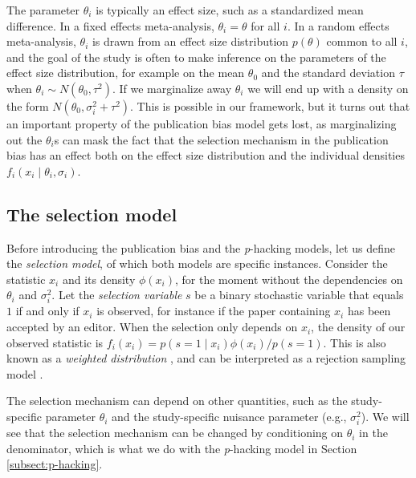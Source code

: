 \documentclass[useAMS,usenatbib,referee]{biom}
\begin{document}
The parameter $\theta_{i}$ is typically an effect size, such as a standardized mean difference. In a fixed effects meta-analysis, $\theta_{i}=\theta$ for all $i$. In a random effects meta-analysis, $\theta_{i}$ is drawn from an effect size distribution $p(\theta)$ common to all $i$, and the goal of the study is often to make inference on the parameters of the effect size distribution, for example on the mean $\theta_{0}$ and the standard deviation $\tau$ when $\theta_i \sim N(\theta_{0},\tau^2)$. If we marginalize away $\theta_{i}$ we will end up with a density on the form $N( \theta_{0},\sigma_{i}^{2}+\tau^{2})$. This is possible in our framework, but it turns out that an important property of the publication bias model gets lost, as marginalizing out the $\theta_{i}$s can mask the fact that the selection mechanism in the publication bias has an effect both on the effect size distribution and the individual densities $f_{i}(x_{i}\mid\theta_i, \sigma_i)$.

\subsection{The selection model}\label{subsec:selectionModel}
Before introducing the publication bias and the \textit{p}-hacking models, let us define the \emph{selection model}, of which both models are specific instances. Consider the statistic $x_i$ and its density $\phi(x_{i})$, for the moment without the dependencies on $\theta_{i}$ and $\sigma^2_{i}$. Let the \emph{selection variable} $s$ be a binary stochastic variable that equals $1$ if and only if $x_i$ is observed, for instance if the paper containing $x_i$ has been accepted by an editor. When the selection only depends on $x_i$, the density of our observed statistic is $f_{i}(x_{i}) = p(s=1\mid x_i)\phi(x_i)/p(s=1)$. This is also known as a \emph{weighted distribution} \citep[][eq. 3.1]{rao1985weighted}, and can be interpreted as a rejection sampling model \citep{von1951various}.

The selection mechanism can depend on other quantities, such as the study-specific parameter $\theta_i$ and the study-specific nuisance parameter (e.g., $\sigma^2_{i}$). We will see that the selection mechanism can be changed by conditioning on $\theta_i$ in the denominator, which is what we do with the \textit{p}-hacking model in Section \ref{subsect:p-hacking}. 

\end{document}
